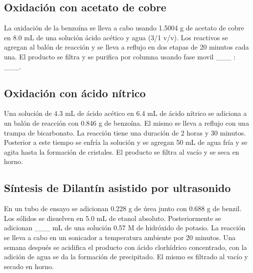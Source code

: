 \documentclass[fleqn,10pt]{SelfArx}
\begin{document}
\subsection{Oxidaci\'on con acetato de cobre}
La oxidaci\'on de la benzo\'ina se lleva a cabo usando 1.5004 g de acetato de cobre en 8.0 mL de una soluci\'on \'acido ac\'etico y agua (3/1 v/v). Los reactivos se agregan al bal\'on de reacci\'on y se lleva a reflujo en dos etapas de 20 minutos cada una. El producto se filtra y se purifica por columna usando fase movil \_\_\_ : \_\_\_.

\subsection{Oxidaci\'on con \'acido n\'itrico}
Una soluci\'on de 4.3 mL de \'acido ac\'etico en 6.4 mL de \'acido n\'itrico se adiciona a un bal\'on de reacci\'on con 0.846 g de benzo\'ina. El mismo se lleva a reflujo con una trampa de bicarbonato. La reacci\'on tiene una duraci\'on de 2 horas y 30 minutos. Posterior a este tiempo se enfr\'ia la soluci\'on y se agregan 50 mL de agua fr\'ia y se agita hasta la formaci\'on de cristales. El producto se filtra al vac\'io y se seca en horno.

\subsection{S\'intesis de Dilant\'in asistido por ultrasonido}
En un tubo de ensayo se adicionan 0.228 g de \'urea junto con 0.688 g de benzil. Los s\'olidos se disuelven en 5.0 mL de etanol absoluto. Posteriormente se adicionan \_\_\_ mL de una soluci\'on 0.57 M de hidr\'oxido de potasio. La reacci\'on se lleva a cabo en un sonicador a temperatura ambiente por 20 minutos. Una semana despu\'es se acidifica el producto con \'acido clorh\'idrico concentrado, con la adici\'on de agua se da la formaci\'on de precipitado. El mismo es filtrado al vac\'io y secado en horno. 



\newpage
\onecolumn
\end{document}
